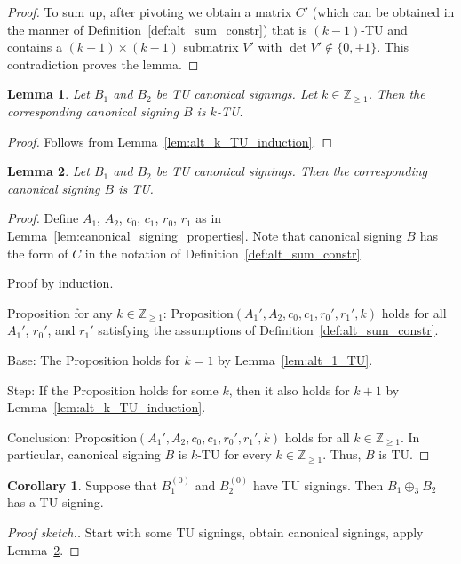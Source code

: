 \documentclass{article}
\newtheorem{lemma}{Lemma}
\theoremstyle{definition}
\newtheorem{corollary}{Corollary}
\begin{document}
\begin{proof}
    To sum up, after pivoting we obtain a matrix $C'$ (which can be obtained in the manner of Definition~\ref{def:alt_sum_constr}) that is $(k - 1)$-TU and contains a $(k - 1) \times (k - 1)$ submatrix $V'$ with $\det V' \notin \{0, \pm 1\}$. This contradiction proves the lemma.
\end{proof}

\begin{lemma}\label{lem:three_sum_k_TU_induction}
    Let $B_{1}$ and $B_{2}$ be TU canonical signings. Let $k \in \mathbb{Z}_{\geq 1}$. Then the corresponding canonical signing $B$ is $k$-TU.
\end{lemma}

\begin{proof}
    Follows from Lemma~\ref{lem:alt_k_TU_induction}.
\end{proof}

\begin{lemma}\label{lem:three_sum_canonical_signing_TU}
    Let $B_{1}$ and $B_{2}$ be TU canonical signings. Then the corresponding canonical signing $B$ is TU.
\end{lemma}

\begin{proof}
    Define $A_{1}$, $A_{2}$, $c_{0}$, $c_{1}$, $r_{0}$, $r_{1}$ as in Lemma~\ref{lem:canonical_signing_properties}. Note that canonical signing $B$ has the form of $C$ in the notation of Definition~\ref{def:alt_sum_constr}.

    Proof by induction.

    Proposition for any $k \in \mathbb{Z}_{\geq 1}$: $\mathrm{Proposition}(A_{1}', A_{2}, c_{0}, c_{1}, r_{0}', r_{1}', k)$ holds for all $A_{1}'$, $r_{0}'$, and $r_{1}'$ satisfying the assumptions of Definition~\ref{def:alt_sum_constr}.

    Base: The Proposition holds for $k = 1$ by Lemma~\ref{lem:alt_1_TU}.

    Step: If the Proposition holds for some $k$, then it also holds for $k + 1$ by Lemma~\ref{lem:alt_k_TU_induction}.

    Conclusion: $\mathrm{Proposition}(A_{1}', A_{2}, c_{0}, c_{1}, r_{0}', r_{1}', k)$ holds for all $k \in \mathbb{Z}_{\geq 1}$. In particular, canonical signing $B$ is $k$-TU for every $k \in \mathbb{Z}_{\geq 1}$. Thus, $B$ is TU.
\end{proof}

\begin{corollary}
    Suppose that $B_{1}^{(0)}$ and $B_{2}^{(0)}$ have TU signings. Then $B_{1} \oplus_{3} B_{2}$ has a TU signing.
\end{corollary}

\begin{proof}[Proof sketch.]
    Start with some TU signings, obtain canonical signings, apply Lemma~\ref{lem:three_sum_canonical_signing_TU}.
\end{proof}
\end{document}
